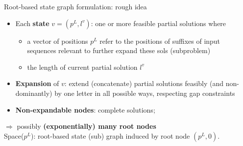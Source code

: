 \documentclass{beamer}
\begin{document}
\begin{frame}{Root-based state graph formulation: rough idea}
  
  
  \begin{itemize}
      
      
      \item Each \textbf{state} $v=(p^L, l^v)$: one or more feasible partial solutions where
      \begin{itemize}
      	  \item  a vector of positions $p^L$ refer to the positions of suffixes of input sequences relevant to  further expand these sols (subproblem)
      	  \item the  length of current partial solution $l^v$ 
      \end{itemize}\vspace{0.3cm}
      \item \textbf{Expansion} of $v$: extend (concatenate)  partial solutions feasibly (and non-dominantly) by one letter  in all possible ways,  respecting gap constraints \vspace{0.3cm}
      \item \textbf{Non-expandable nodes}: complete solutions; 
  \end{itemize} \vspace{0.15cm}
  
   $\Rightarrow$ possibly \textbf{(exponentially) many root nodes}  \\ \vspace{0.2cm} {Space($p^L$)}: root-based state (sub) graph  induced by root node $(p^L, 0)$.
\end{frame}
\end{document}
